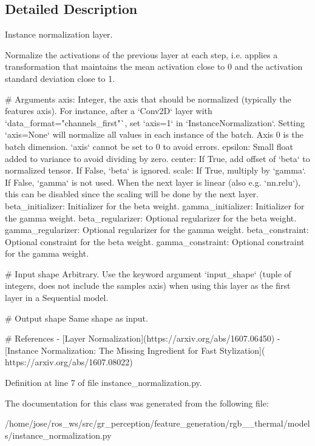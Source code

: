 \subsection{Detailed Description}
\begin{DoxyVerb}Instance normalization layer.

Normalize the activations of the previous layer at each step,
i.e. applies a transformation that maintains the mean activation
close to 0 and the activation standard deviation close to 1.

# Arguments
    axis: Integer, the axis that should be normalized
        (typically the features axis).
        For instance, after a `Conv2D` layer with
        `data_format="channels_first"`,
        set `axis=1` in `InstanceNormalization`.
        Setting `axis=None` will normalize all values in each
        instance of the batch.
        Axis 0 is the batch dimension. `axis` cannot be set to 0 to avoid errors.
    epsilon: Small float added to variance to avoid dividing by zero.
    center: If True, add offset of `beta` to normalized tensor.
        If False, `beta` is ignored.
    scale: If True, multiply by `gamma`.
        If False, `gamma` is not used.
        When the next layer is linear (also e.g. `nn.relu`),
        this can be disabled since the scaling
        will be done by the next layer.
    beta_initializer: Initializer for the beta weight.
    gamma_initializer: Initializer for the gamma weight.
    beta_regularizer: Optional regularizer for the beta weight.
    gamma_regularizer: Optional regularizer for the gamma weight.
    beta_constraint: Optional constraint for the beta weight.
    gamma_constraint: Optional constraint for the gamma weight.

# Input shape
    Arbitrary. Use the keyword argument `input_shape`
    (tuple of integers, does not include the samples axis)
    when using this layer as the first layer in a Sequential model.

# Output shape
    Same shape as input.

# References
    - [Layer Normalization](https://arxiv.org/abs/1607.06450)
    - [Instance Normalization: The Missing Ingredient for Fast Stylization](
    https://arxiv.org/abs/1607.08022)
\end{DoxyVerb}
 

Definition at line 7 of file instance\+\_\+normalization.\+py.



The documentation for this class was generated from the following file\+:\begin{DoxyCompactItemize}
\item 
/home/jose/ros\+\_\+ws/src/gr\+\_\+perception/feature\+\_\+generation/rgb\+\_\+\_\+thermal/models/instance\+\_\+normalization.\+py\end{DoxyCompactItemize}
